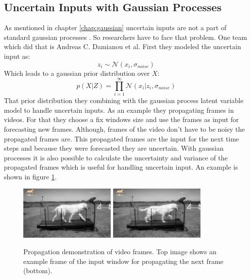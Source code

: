 \subsection{Uncertain Inputs with Gaussian Processes}
\label{chap:uncertain_inputs}
As mentioned in chapter \ref{chap:gaussian} uncertain inputs are not a part of standard gaussian processes
\cite{damianou_variational_2014}. So researchers have to face that problem. One team which did that is 
Andreas C. Damianou et al. First they modeled the uncertain input as:
$$
z_i \sim \mathcal{N}(x_i, \sigma_{noise})
$$
Which leads to a gaussian prior distribution over $X$:
$$
p(X|Z) = \prod_{i=1}^{\infty} \mathcal{N}(x_i| z_i, \sigma_{noise})
$$
That prior distribution they combining with the gaussian process latent variable model to handle
uncertain inputs. As an example they propagating frames in videos. For that they choose a 
fix windows size and use the frames as input for forecasting new frames. Although, frames
of the video don't have to be noisy the propagated frames are. This propagated frames are the input 
for the next time steps and because they were forecasted they are uncertain. With gaussian processes 
it is also possible to calculate the uncertainty and variance of the propagated frames which is useful 
for handling uncertain input. An example is shown in figure \ref{fig:damianou_example}.

\begin{figure}[h!]
	\centering
	\includegraphics[width=0.425\textwidth]{images/damianou_example_1.png}
	\includegraphics[width=0.425\textwidth]{images/damianou_example_2.png}
	\caption{
		Propagation demonstration of video frames. Top image shows an example
		frame of the input window for propagating the next frame (bottom). 
        }
	\label{fig:damianou_example}
\end{figure}